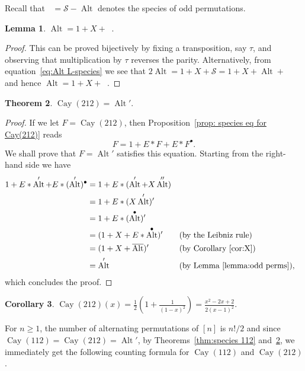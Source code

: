 \documentclass[a4paper, 11pt]{article}
\DeclareMathOperator{\Cay}{Cay}
\DeclareMathOperator{\Alt}{Alt}
\DeclareMathOperator{\AltC}{\overline{\Alt}}
\newcommand{\Sym}{\mathcal{S}}
\theoremstyle{definition}
\newtheorem{theorem}{Theorem}[section]
\newtheorem{corollary}[theorem]{Corollary}
\newtheorem{lemma}[theorem]{Lemma}
\begin{document}
Recall that $\AltC=\Sym-\Alt$ denotes the species of odd permutations.

\begin{lemma}\label{lemma:odd perms}
  $\Alt = 1+X+\AltC$.
\end{lemma}
\begin{proof}
  This can be proved bijectively by fixing a transposition, say $\tau$, and
  observing that multiplication by $\tau$ reverses the
  parity. Alternatively, from equation~\eqref{eq:Alt L-species} we see
  that $2\Alt = 1 + X + \Sym = 1 + X + \Alt + \AltC$ and hence
  $\Alt = 1 + X + \AltC$.
\end{proof}

\begin{theorem}\label{thm:species 212}
  $\Cay(212) = \Alt'$.
\end{theorem}
\begin{proof}
  If we let $F=\Cay(212)$, then Proposition~\ref{prop: species eq for Cay(212)} reads
  \begin{equation}\label{eq:Cay(212)}
    F = 1 + E * F + E * F^{\bullet}.
  \end{equation}
  We shall prove that $F=\Alt'$ satisfies this equation. Starting from
  the right-hand side we have
  \begin{align*}
    1 + E*\Alt' + E*(\Alt')^{\bullet}
    &= 1 + E*(\Alt' + X\Alt'')\\
    &= 1 + E*(X\Alt')' \\
    &= 1 + E*(\Alt^{\bullet})' \\
    &= (1 + X + E*\Alt^{\bullet})' && \text{(by the Leibniz rule)} \\
    &= (1 + X + \AltC)' && \text{(by Corollary~\ref{cor:X})} \\
    &= \Alt' && \text{(by Lemma~\ref{lemma:odd perms})},
  \end{align*}
  which concludes the proof.
\end{proof}

\begin{corollary}\label{prop:egf cay(212)}
  $\displaystyle \Cay(212)(x)
  = \displaystyle\frac{1}{2}\left(1+\frac{1}{(1-x)^2}\right)
  = \frac{x^2-2x+2}{2(x-1)^2}$.
\end{corollary}

For $n\geq 1$, the number of alternating permutations of $[n]$ is $n!/2$ and since
$\Cay(112) = \Cay(212)=\Alt'$, by Theorems~\ref{thm:species 112} and~\ref{thm:species 212},
we immediately get the following counting formula for
$\Cay(112)$ and $\Cay(212)$.
\end{document}
